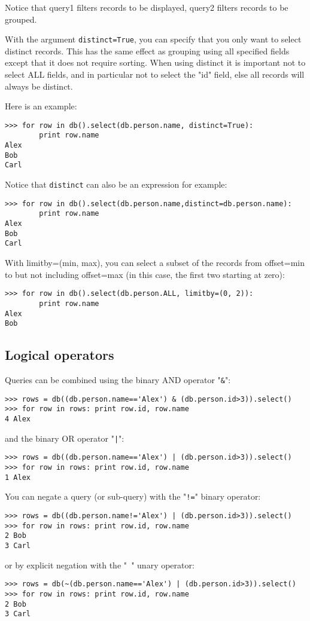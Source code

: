 \documentclass[justified,sixbynine,notoc]{tufte-book}
\def\ft{\small\tt}
\def\inxx#1{\index{#1}}
\begin{document}
\begin{fullwidth}
Notice that query1 filters records to be displayed, query2 filters records to be grouped.

\inxx{distinct}

With the argument {\ft distinct=True}, you can specify that you only want to select distinct records. This has the same effect as grouping using all specified fields except that it does not require sorting. When using distinct it is important not to select ALL fields, and in particular not to select the "id" field, else all records will always be distinct.

Here is an example:
\begin{lstlisting}
>>> for row in db().select(db.person.name, distinct=True):
        print row.name
Alex
Bob
Carl
\end{lstlisting}

Notice that {\ft distinct} can also be an expression for example:
\begin{lstlisting}
>>> for row in db().select(db.person.name,distinct=db.person.name):
        print row.name
Alex
Bob
Carl
\end{lstlisting}

With limitby=(min, max), you can select a subset of the records from offset=min to but not including offset=max (in this case, the first two starting at zero):

\inxx{limitby}
\begin{lstlisting}
>>> for row in db().select(db.person.ALL, limitby=(0, 2)):
        print row.name
Alex
Bob
\end{lstlisting}

\goodbreak\subsection{Logical operators}

Queries can be combined using the binary AND operator "{\ft \&}":

\inxx{and} \inxx{or} \inxx{not}
\begin{lstlisting}
>>> rows = db((db.person.name=='Alex') & (db.person.id>3)).select()
>>> for row in rows: print row.id, row.name
4 Alex
\end{lstlisting}
\noindent and the binary OR operator "{\ft |}":
\begin{lstlisting}
>>> rows = db((db.person.name=='Alex') | (db.person.id>3)).select()
>>> for row in rows: print row.id, row.name
1 Alex
\end{lstlisting}

You can negate a query (or sub-query) with the "{\ft !=}" binary operator:
\begin{lstlisting}
>>> rows = db((db.person.name!='Alex') | (db.person.id>3)).select()
>>> for row in rows: print row.id, row.name
2 Bob
3 Carl
\end{lstlisting}
\noindent or by explicit negation with the "{\ft ~}" unary operator:
\begin{lstlisting}
>>> rows = db(~(db.person.name=='Alex') | (db.person.id>3)).select()
>>> for row in rows: print row.id, row.name
2 Bob
3 Carl
\end{lstlisting}


\end{fullwidth}
\end{document}
